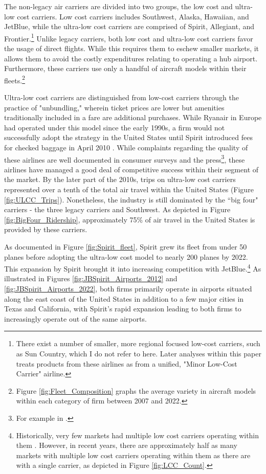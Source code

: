\documentclass{article}
\begin{document}
	The non-legacy air carriers are divided into two groups, the low cost and ultra-low cost carriers. Low cost carriers includes Southwest, Alaska,  Hawaiian, and JetBlue, while the ultra-low cost carriers are comprised of Spirit, Allegiant, and Frontier.\footnote{There exist a number of smaller, more regional focused low-cost carriers, such as Sun Country, which I do not refer to here. Later analyses within this paper treats products from these airlines as from a unified, "Minor Low-Cost Carrier" airline.} Unlike legacy carriers, both low cost and ultra-low cost carriers favor the usage of direct flights. While this requires them to eschew smaller markets, it allows them to avoid the costly expenditures relating to operating a hub airport. Furthermore, these carriers use only a handful of aircraft models within their fleets.\footnote{Figure \ref{fig:Fleet_Composition} graphs the average variety in aircraft models within each category of firm between 2007 and 2022.}

	Ultra-low cost carriers are distinguished from low-cost carriers through the practice of "unbundling," wherein ticket prices are lower but amenities traditionally included in a fare are additional purchases. While Ryanair in Europe had operated under this model since the early 1990s, a firm would not successfully adopt the strategy in the United States until Spirit introduced fees for checked baggage in April 2010 \citep{bachwich_emergence_2017}. While complaints regarding the quality of these airlines are well documented in consumer surveys and the press\footnote{For example in \citet{vasel_spirit_2016, elliott_jetblue_2022}.}, these airlines have managed a good deal of competitive success within their segment of the market. By the later part of the 2010s, trips on ultra-low cost carriers represented over a tenth of the total air travel within the United States (Figure \ref{fig:ULCC_Trips}).  Nonetheless, the industry is still dominated by the ``big four" carriers - the three legacy carriers and Southwest.  As depicted in Figure \ref{fig:BigFour_Ridership}, approximately 75\% of air travel in the United States is provided by these carriers. 
	
	 As documented in Figure \ref{fig:Spirit_fleet}, Spirit grew its fleet from under 50 planes before adopting the ultra-low cost model to nearly 200 planes by 2022. This expansion by Spirit brought it into increasing competition with JetBlue.\footnote{Historically, very few markets had multiple low cost carriers operating within them \citep{kwoka_fringe_2016, ciliberto_market_2021}. However, in recent years, there are approximately half as many markets with multiple low cost carriers operating within them as there are with a single carrier, as depicted in Figure \ref{fig:LCC_Count}.} As illustrated in Figures \ref{fig:JBSpirit_Airports_2012} and \ref{fig:JBSpirit_Airports_2022}, both firms primarily operate in airports situated along the east coast of the United States in addition to a few major cities in Texas and California, with Spirit's rapid expansion leading to both firms to increasingly operate out of the same airports.
	
\end{document}
